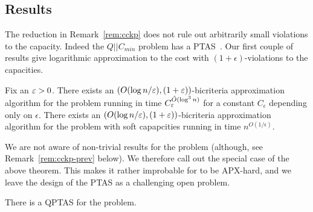 \subsection{Results}
The reduction in Remark~\ref{rem:cckp} does not rule out arbitrarily small violations to the capacity. Indeed the $Q||C_{min}$ problem has a PTAS~\cite{Azar-Epstein-APPROX98}.
Our first couple of results give logarithmic approximation to the cost with $(1+\epsilon)$-violations to the capacities.
\begin{theorem}\label{thm:1}
	Fix an $\varepsilon > 0$. There exists an $(O(\log n/\varepsilon), (1+\varepsilon))$-bicriteria approximation algorithm for the \mckc problem running in time $C_\varepsilon^{\tilde{O}(\log^3n)}$ for a constant $C_\epsilon$ depending only on $\epsilon$. There exists an $(O(\log n/\varepsilon), (1+\varepsilon))$-bicriteria approximation algorithm for the \mckc problem with soft capapcities running in time $n^{O(1/\epsilon)}$. 
\end{theorem}
We are not aware of non-trivial results for the \cckp problem (although, see Remark~\ref{rem:cckp-prev} below). We therefore call out the special case of the above theorem.
This makes it rather improbable for \cckp to be APX-hard, and we leave the design of the PTAS as a challenging open problem.
\begin{theorem}\label{thm:q}
	There is a QPTAS for the \cckp problem.
\end{theorem}

